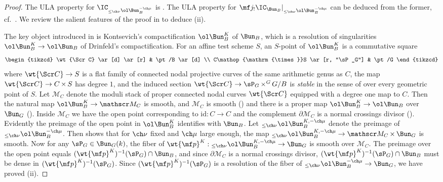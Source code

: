 \documentclass[final]{amsart}
\theoremstyle{remark}
\theoremstyle{definition}
\DeclareMathOperator*{\xt}{\times}
\numberwithin{equation}{section}
\begin{document}
\begin{proof}
The ULA property for $\IC_{_{\le \ch\nu}\ol\Bun^{-\ch\mu}_B}$ 
is \cite[Corollary 4.1.1.1]{Campbell}. 
The ULA property for $\mf j_! \IC_{\Bun_B}|_{_{\le \ch\nu}\ol\Bun^{-\ch\mu}_B}$ can be deduced from the former, cf.~\cite[\S 4.3]{Campbell2}. 
We review the salient features of the proof in \cite{Campbell} to deduce (ii). 

The key object introduced in \cite{Campbell} is Kontsevich's compactification
$\ol\Bun_B^K$ of $\Bun_B$, which is a resolution of singularities $\ol\Bun_B^K \to \ol\Bun_B$
of Drinfeld's compactification. For an affine test scheme $S$, 
an $S$-point of $\ol\Bun_B^K$ is a commutative square
\[ 
\begin{tikzcd}
\wt{\Scr C} \ar[d] \ar[r] & \pt/B \ar[d] \\ C\xt S \ar[r, "\sP_G"] & \pt/G 
\end{tikzcd} 
\]
where $\wt{\Scr C} \to S$ is a flat family of connected nodal projective curves of the
same arithmetic genus as $C$, the map $\wt{\Scr C} \to C\xt S$ has degree $1$, 
and the induced section $\wt{\Scr C} \to \sP_G \xt^G G/B$ is \emph{stable} 
in the sense of \cite{Kontsevich} over every geometric point of $S$.
Let $\mathscr M_C$ denote the moduli stack of proper connected nodal curves $\wt{\Scr C}$
equipped with a degree one map to $C$. 
Then the natural map $\ol\Bun_B^K\to \mathscr M_C$ is smooth, and $\mathscr M_C$ is
smooth (\cite[Proposition 2.4.1]{Campbell}) and there is a proper map
$\ol\Bun_B^K \to \ol\Bun_B$ over $\Bun_G$ (\cite[Proposition 3.2.2]{Campbell}). 
Inside $\mathscr M_C$ we have the open point corresponding to $\mathrm{id} : C\to C$
and the complement $\partial\mathscr M_C$ is a normal crossings divisor (\cite[Proposition 4.4.1]{Campbell}). Evidently the preimage of the open point in $\ol\Bun_B^K$ identifies
with $\Bun_B$. 
Let $_{\le\ch\nu}\ol\Bun_B^{K,-\ch\mu}$ denote the preimage of $_{\le\ch\nu}\ol\Bun_B^{-\ch\mu}$. Then \cite[Proposition 4.1.1]{Campbell} shows that
for $\ch\nu$ fixed and $\ch\mu$ large enough, the map 
$_{\le\ch\nu}\ol\Bun_B^{K,-\ch\mu} \to \mathscr M_C \xt \Bun_G$ is smooth. 
Now for any $\sP_G \in \Bun_G(k)$, the fiber of $\wt{\mf p}^K: {_{\le\ch\nu}}\ol\Bun_B^{K,-\ch\mu} \to \Bun_G$ is smooth over $\mathscr M_C$.
The preimage over the open point equals $(\wt{\mf p}^K)^{-1}(\sP_G) \cap \Bun_B$, 
and since $\partial \mathscr M_C$ is a normal crossings divisor, 
$(\wt{\mf p}^K)^{-1}(\sP_G) \cap \Bun_B$ must be dense in $(\wt{\mf p}^K)^{-1}(\sP_G)$.
Since $(\wt{\mf p}^K)^{-1}(\sP_G)$ is a resolution of
the fiber of $_{\le\ch\nu}\ol\Bun_B^{-\ch\mu}\to\Bun_G$, we have proved (ii).
\end{proof}
\end{document}
